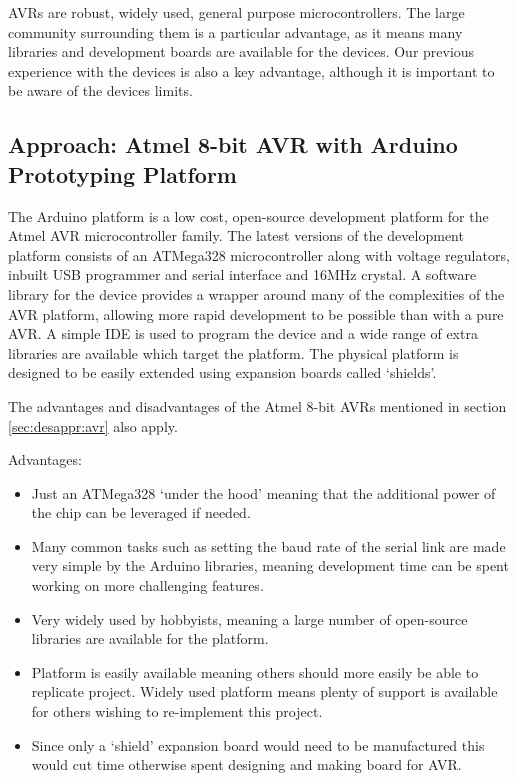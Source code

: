 AVRs are robust, widely used, general purpose microcontrollers. The large community surrounding them is a particular advantage, as it means many libraries and development boards are available for the devices. Our previous experience with the devices is also a key advantage, although it is important to be aware of the devices limits.


\subsection{Approach: Atmel 8-bit AVR with Arduino Prototyping Platform}

The Arduino platform is a low cost, open-source development platform for the Atmel AVR microcontroller family. The latest versions of the development platform consists of an ATMega328 microcontroller along with voltage regulators, inbuilt USB programmer and serial interface and 16MHz crystal. A software library for the device provides a wrapper around many of the complexities of the AVR platform, allowing more rapid development to be possible than with a pure AVR. A simple IDE is used to program the device and a wide range of extra libraries are available which target the platform. The physical platform is designed to be easily extended using expansion boards called `shields'.

The advantages and disadvantages of the Atmel 8-bit AVRs mentioned in section \ref{sec:desappr:avr} also apply.

Advantages:
\begin{itemize}
\item Just an ATMega328 `under the hood' meaning that the additional power of the chip can be leveraged if needed.

\item Many common tasks such as setting the baud rate of the serial link are made very simple by the Arduino libraries, meaning development time can be spent working on more challenging features.

\item Very widely used by hobbyists, meaning a large number of open-source libraries are available for the platform.

\item Platform is easily available meaning others should more easily be able to replicate project. Widely used platform means plenty of support is available for others wishing to re-implement this project.

\item Since only a `shield' expansion board would need to be manufactured this would cut time otherwise spent designing and making board for AVR.
\end{itemize}

